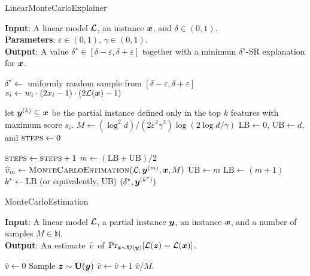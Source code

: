 
\begin{algorithm}[tb]
	\caption{LinearMonteCarloExplainer}
	\label{alg:algorithm}
	\textbf{Input}: A linear model $\mathcal{L}$, an instance ${\bm{x}}$, and $\delta \in (0, 1)$.\\
	\textbf{Parameters}:  $\varepsilon \in (0, 1)$,  $\gamma \in (0, 1)$.\\
	\textbf{Output}: A value $\delta^\star \in [\delta-\varepsilon, \delta+\varepsilon]$ together with a minimum $\delta^\star$-SR explanation for ${\bm{x}}$.\\
	\begin{algorithmic}[1] %
	\STATE $\delta^\star \gets$ uniformly random sample from $[\delta-\varepsilon, \delta + \varepsilon]$ \label{line:delta}
		\STATE $s_i \gets  w_i \cdot (2x_i - 1) \cdot (2\mathcal{L}({\bm{x}}) - 1)$
	\ENDFOR
	
		\STATE  let ${\bm{y}}^{(k)} \subseteq {\bm{x}}$ be the partial instance defined only in the top $k$ features with maximum score $s_i$.\label{line:greedy}
	\ENDFOR
	\STATE $M \gets (\log^2{d})/(2\varepsilon^2 \gamma^2) \log(2 \log d / \gamma)$\label{line:mdef}
	\STATE $\textrm{LB} \gets 0$, $\textrm{UB} \gets d$, and $\textsc{steps} \gets 0$

	\label{line:while}
		\STATE $\textsc{steps} \gets \textsc{steps} + 1$\label{line:steps}
		\STATE $m \gets \left(\textrm{LB} + \textrm{UB} \right)/2$
		\STATE $\widehat{v}_m \gets \textsc{MonteCarloEstimation}(\mathcal{L}, {\bm{y}}^{(m)}, {\bm{x}}, M)$ \label{line:montecarlo}
			\STATE $\textrm{UB} \gets m$
		\ELSE
			\STATE $\textrm{LB} \gets (m+1)$
		\ENDIF
	\ENDWHILE\label{line:endwhile}
	\STATE $k^\star \gets \textrm{LB}$ (or equivalently, $\textrm{UB}$)
	\STATE \RETURN $(\delta^\star, {\bm{y}}^{(k^\star)})$
	\end{algorithmic}
	\end{algorithm}


\begin{algorithm}[tb]
	\caption{MonteCarloEstimation}	\label{alg:montecarlo}
	\textbf{Input}: A linear model $\mathcal{L}$, a partial instance ${\bm{y}}$, an instance ${\bm{x}}$, and a number of samples $M \in \mathbb{N}$.\\
	\textbf{Output}: An estimate~$\widehat{v}$~of~$\Pr_{{\bm{z}} \sim \mathbf{U}({\bm{y}})}[\mathcal{L}({\bm{z}})=\mathcal{L}({\bm{x}})]$.\\
	\begin{algorithmic}[1]
	\STATE $\widehat{v} \gets 0$
		\STATE Sample ${\bm{z}} \sim \mathbf{U}({\bm{y}})$
		\IF {$\Lin(\vz) = \Lin(\vx)$}
			\STATE $\widehat{v} \gets \widehat{v} + 1$
		\ENDIF \ENDFOR
	\STATE \RETURN $\widehat{v}/M$.
\end{algorithmic}
\end{algorithm}


